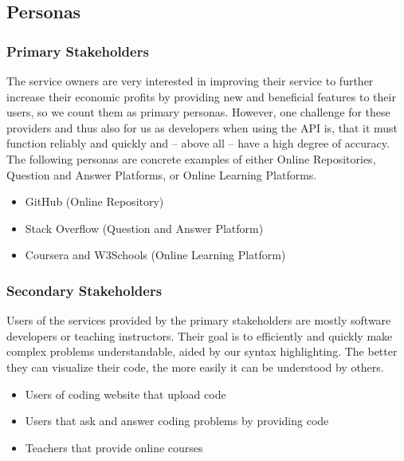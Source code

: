 \documentclass[11pt]{article}
\begin{document}
\subsection{Personas}

\subsubsection*{Primary Stakeholders}
The service owners are very interested in improving their service to further increase their economic profits by providing new and beneficial features to their users, so we count them as primary personas. However, one challenge for these providers and thus also for us as developers when using the API is, that it must function reliably and quickly and -- above all -- have a high degree of accuracy. The following personas are concrete examples of either Online Repositories, Question and Answer Platforms, or Online Learning Platforms.
\begin{itemize}
\item GitHub (Online Repository)
\item Stack Overflow (Question and Answer Platform)
\item Coursera and W3Schools (Online Learning Platform)
\end{itemize}


\subsubsection*{Secondary Stakeholders}
Users of the services provided by the primary stakeholders are mostly software developers or teaching instructors. Their goal is to efficiently and quickly make complex problems understandable, aided by our syntax highlighting. The better they can visualize their code, the more easily it can be understood by others.

\begin{itemize}
\item Users of coding website that upload code
\item Users that ask and answer coding problems by providing code
\item Teachers that provide online courses
\end{itemize}
\end{document}
